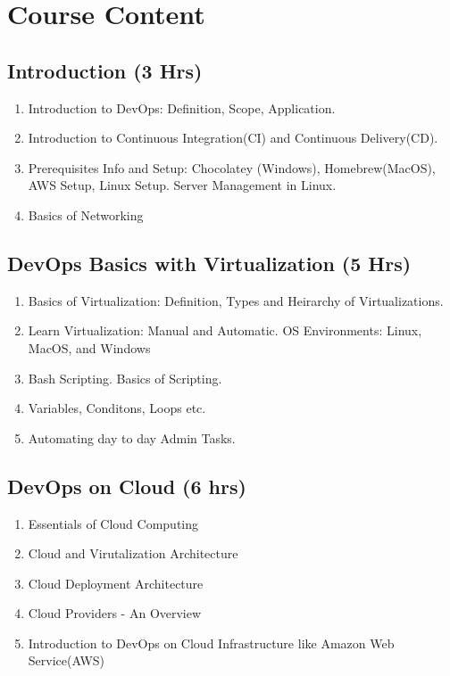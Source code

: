 \section{Course Content}
\noindent
\subsection{Introduction \hfill (3 Hrs)} 

\begin{enumerate}
    \item Introduction to DevOps: Definition, Scope, Application.
    \item Introduction to Continuous Integration(CI) and Continuous Delivery(CD).
    \item Prerequisites Info and Setup: Chocolatey (Windows), Homebrew(MacOS), AWS Setup, Linux Setup. Server Management in Linux. 
    \item Basics of Networking
\end{enumerate}

\subsection{DevOps Basics with Virtualization \hfill (5 Hrs)} 

\begin{enumerate}
    \item Basics of Virtualization: Definition, Types and Heirarchy of Virtualizations.
    \item Learn Virtualization: Manual and Automatic. OS Environments: Linux, MacOS, and Windows
    \item Bash Scripting. Basics of Scripting.
    \item Variables, Conditons, Loops etc. 
    \item Automating day to day Admin Tasks.
    
\end{enumerate}

\subsection{DevOps on Cloud \hfill (6 hrs)} 

\begin{enumerate}
    \item Essentials of Cloud Computing
    \item Cloud and Virutalization Architecture
    \item Cloud Deployment Architecture
    \item Cloud Providers - An Overview
    \item Introduction to DevOps on Cloud Infrastructure like Amazon Web Service(AWS)
    
\end{enumerate}

